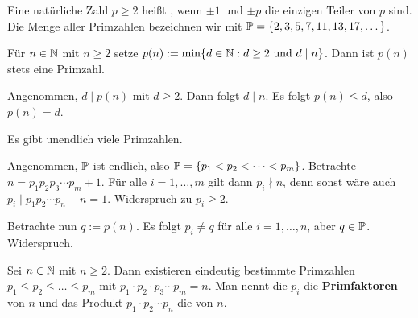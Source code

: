 	\begin{definition}[Primzahl]
		Eine natürliche Zahl $p \geq 2$ heißt , wenn $\pm 1$ und $\pm p$ die einzigen Teiler von $p$ sind. \marginnote{[9]}
		Die Menge aller Primzahlen bezeichnen wir mit $\mathbb{P} = \{2,3,5,7,11,13,17,\dots\}$.
	\end{definition}

	\begin{lemma}
		Für $n \in \mathbb{N}$ mit $n \geq 2$ setze $p(n) := \min\{d \in \mathbb{N} : d \geq 2 \text{ und } d \mid n\}$.
		Dann ist $p(n)$ stets eine Primzahl.
	\end{lemma}

	\begin{beweis}
		Angenommen, $d \mid p(n)$ mit $d \geq 2$.
		Dann folgt $d \mid n$.
		Es folgt $p(n) \leq d$, also $p(n) = d$.
	\end{beweis}

	\begin{satz}[Euklid]
		Es gibt unendlich viele Primzahlen. \marginnote{[10]}
	\end{satz}

	\begin{beweis}
		Angenommen, $\mathbb{P}$ ist endlich, also $\mathbb{P}= \{p_1 < p_2 < \dots < p_m\}$.
		Betrachte $n = p_1p_2p_3 \cdots p_m + 1$.
		Für alle $i = 1, \dots, m$ gilt dann $p_i \nmid n$, denn sonst wäre auch $p_i \mid p_1p_2\cdots p_n - n = 1$.
		Widerspruch zu $p_i \geq 2$.
		
		Betrachte nun $q := p(n)$.
		Es folgt $p_i \neq q$ für alle $i=1,\dots,n$, aber $q \in \mathbb{P}$.
		Widerspruch.
	\end{beweis}

	\begin{thm}
		Sei $n \in \mathbb{N}$ mit $n \geq 2$. \marginnote{[11]}
		Dann existieren eindeutig bestimmte Primzahlen $p_1 \leq p_2 \leq \dots \leq p_m$ mit $p_1 \cdot p_2 \cdot p_3 \cdots p_m = n$.
		Man nennt die $p_i$ die \textbf{Primfaktoren} von $n$ und das Produkt $p_1 \cdot p_2 \cdots p_n$ die  von $n$.
	\end{thm}

